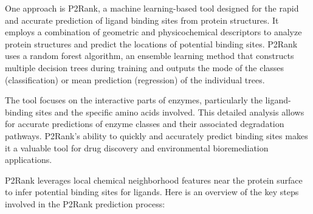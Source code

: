 One approach is P2Rank, a machine learning-based tool designed for the rapid and accurate prediction of ligand binding sites from protein structures. It employs a combination of geometric and physicochemical descriptors to analyze protein structures and predict the locations of potential binding sites. P2Rank uses a random forest algorithm, an ensemble learning method that constructs multiple decision trees during training and outputs the mode of the classes (classification) or mean prediction (regression) of the individual trees.

The tool focuses on the interactive parts of enzymes, particularly the ligand-binding sites and the specific amino acids involved. This detailed analysis allows for accurate predictions of enzyme classes and their associated degradation pathways. P2Rank's ability to quickly and accurately predict binding sites makes it a valuable tool for drug discovery and environmental bioremediation applications.

P2Rank leverages local chemical neighborhood features near the protein surface to infer potential binding sites for ligands. Here is an overview of the key steps involved in the P2Rank prediction process:

